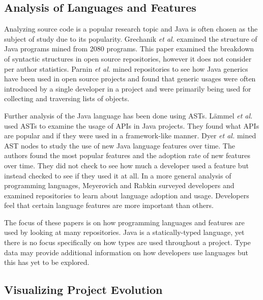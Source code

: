 \subsection{Analysis of Languages and Features}

Analyzing source code is a popular research topic and Java is often chosen as the subject of study due to its popularity. Grechanik \textit{et al.} \cite{Grechanik:2010:EIL:1852786.1852801} examined the structure of Java programs mined from 2080 programs. This paper examined the breakdown of syntactic structures in open source repositories, however it does not consider per author statistics. Parnin \textit{et al.} \cite{Parnin:2011:JGA:1985441.1985446} mined repositories to see how Java generics have been used in open source projects and found that generic usages were often introduced by a single developer in a project and were primarily being used for collecting and traversing lists of objects.

Further analysis of the Java language has been done using ASTs. L\"{a}mmel \textit{et al.} \cite{Lammel:2011:LAA:1982185.1982471} used ASTs to examine the usage of APIs in Java projects. They found what APIs are popular and if they were used in a framework-like manner. Dyer \textit{et al.} \cite{Dyer:2014:MBA:2568225.2568295} mined AST nodes to study the use of new Java language features over time. The authors found the most popular features and the adoption rate of new features over time. They did not check to see how much a developer used a feature but instead checked to see if they used it at all. In a more general analysis of programming languages, Meyerovich and Rabkin \cite{Meyerovich:2013:EAP:2509136.2509515} surveyed developers and examined repositories to learn about language adoption and usage. Developers feel that certain language features are more important than others.

The focus of these papers is on how programming languages and features are used by looking at many repositories. Java is a statically-typed language, yet there is no focus specifically on how types are used throughout a project. Type data may provide additional information on how developers use languages but this has yet to be explored.

\subsection{Visualizing Project Evolution}

